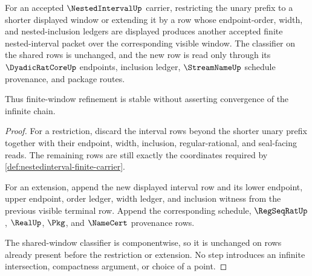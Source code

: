 \begin{theorem}
\label{thm:nestedinterval-window-refinement}
For an accepted $\NestedIntervalUp$ carrier, restricting the unary prefix to a shorter displayed window or extending it by a row whose endpoint-order, width, and nested-inclusion ledgers are displayed produces another accepted finite nested-interval packet over the corresponding visible window. The classifier on the shared rows is unchanged, and the new row is read only through its $\DyadicRatCoreUp$ endpoints, inclusion ledger, $\StreamNameUp$ schedule provenance, and package routes.

Thus finite-window refinement is stable without asserting convergence of the infinite chain.
\end{theorem}
\begin{proof}
For a restriction, discard the interval rows beyond the shorter unary prefix together with their endpoint, width, inclusion, regular-rational, and seal-facing reads. The remaining rows are still exactly the coordinates required by \autoref{def:nestedinterval-finite-carrier}.

For an extension, append the new displayed interval row and its lower endpoint, upper endpoint, order ledger, width ledger, and inclusion witness from the previous visible terminal row. Append the corresponding schedule, $\RegSeqRatUp$, $\RealUp$, $\Pkg$, and $\NameCert$ provenance rows.

The shared-window classifier is componentwise, so it is unchanged on rows already present before the restriction or extension. No step introduces an infinite intersection, compactness argument, or choice of a point.
\end{proof}

